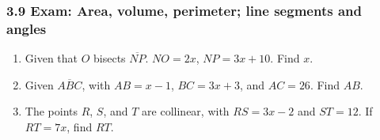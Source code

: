\documentclass[12pt, twoside]{article}
\begin{document}
\subsubsection*{3.9 Exam: Area, volume, perimeter; line segments and angles}
  \vspace{0.25cm}
  \begin{enumerate}

    \subsubsection*{Do Not Solve! \\
    Label the drawing completely and write an equation in terms of $x$ modeling the situation.}
    \vspace{0.5cm}
  
  \item Given that $O$ bisects $\overline{NP}$. $NO=2x$, $NP=3x+10$. Find ${x}$. \vspace{1cm}
  \begin{flushright}
    \end{flushright} \vspace{2cm}
    
  \item Given $\overline{ABC}$, with $AB=x-1$, $BC=3x+3$, and $AC=26$. Find ${AB}$. \vspace{1cm}
  \begin{flushright}
    \end{flushright} \vspace{2cm}
  
  \item The points $R$, $S$, and $T$ are collinear, with $RS=3x-2$ and $ST=12$. If $RT=7x$, find ${RT}$. \vspace{1cm}
  \begin{flushright}
    \end{flushright} \vspace{2cm}
    

\end{enumerate}
\end{document}

